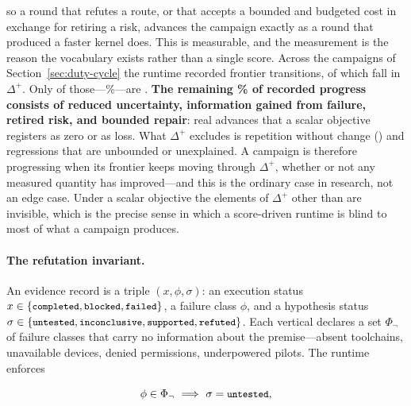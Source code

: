 so a round that refutes a route, or that accepts a bounded and budgeted cost in
exchange for retiring a risk, advances the campaign exactly as a round that produced
a faster kernel does. This is measurable, and the measurement is the reason the
vocabulary exists rather than a single score. Across the campaigns of
Section~\ref{sec:duty-cycle} the runtime recorded \FrontierTotal{} frontier
transitions, of which \FrontierProgress{} fall in $\Delta^{+}$. Only
\FrontierArtifact{} of those---\FrontierArtifactPct\%---are
. \textbf{The remaining \FrontierInvisiblePct\% of recorded
progress consists of reduced uncertainty, information gained from failure, retired
risk, and bounded repair}: real advances that a scalar objective registers as zero or
as loss. What $\Delta^{+}$ excludes is repetition without change
() and regressions that are unbounded or unexplained. A
campaign is therefore progressing when its frontier keeps moving through
$\Delta^{+}$, whether or not any measured quantity has improved---and this is the
ordinary case in research, not an edge case. Under a scalar objective the elements
of $\Delta^{+}$ other than  are invisible, which is the
precise sense in which a score-driven runtime is blind to most of what a campaign
produces.

\paragraph{The refutation invariant.}
An evidence record is a triple $(x,\phi,\sigma)$: an execution status
$x\in\{\texttt{\small completed},\texttt{\small blocked},\texttt{\small failed}\}$, a failure class $\phi$, and a
hypothesis status $\sigma\in\{\texttt{\small untested},\texttt{\small inconclusive},
\texttt{\small supported},\texttt{\small refuted}\}$. Each vertical declares a set $\Phi_{\lnot}$ of
failure classes that carry no information about the premise---absent toolchains,
unavailable devices, denied permissions, underpowered pilots. The runtime enforces

\begin{equation}
  \phi\in\Phi_{\lnot}\ \Longrightarrow\ \sigma=\code{untested},
  \label{eq:refutation-invariant}
\end{equation}

